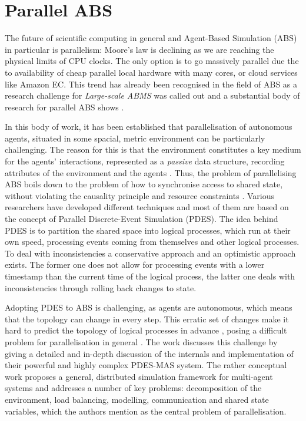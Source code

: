 \chapter{Parallel ABS}
\label{ch:parallel_abs}
The future of scientific computing in general and Agent-Based Simulation (ABS) in particular is parallelism: Moore's law is declining as we are reaching the physical limits of CPU clocks. The only option is to go massively parallel due the to availability of cheap parallel local hardware with many cores, or cloud services like Amazon EC. This trend has already been recognised in the field of ABS as a research challenge for \textit{Large-scale ABMS} \cite{macal_everything_2016} was called out and a substantial body of research for parallel ABS shows \cite{abar_agent_2017, cicirelli_efficient_2015,  gasser_mace3j:_2002,  gorur_repast_2016, hay_experiments_2015, himmelspach_plugn_2007, lees_using_2008, logan_distributed_2001, minson_distributing_2008, riley_next_2003, suryanarayanan_synchronised_2013, suryanarayanan_pdes-mas_2013}. 

In this body of work, it has been established that parallelisation of autonomous agents, situated in some spacial, metric environment can be particularly challenging. The reason for this is that the environment constitutes a key medium for the agents' interactions, represented as a \textit{passive} data structure, recording attributes of the environment and the agents \cite{lees_using_2008}. Thus, the problem of parallelising ABS boils down to the problem of how to synchronise access to shared state, without violating the causality principle and resource constraints \cite{logan_distributed_2001, suryanarayanan_pdes-mas_2013}. Various researchers have developed different techniques and most of them are based on the concept of Parallel Discrete-Event Simulation (PDES). The idea behind PDES is to partition the shared space into logical processes, which run at their own speed, processing events coming from themselves and other logical processes. To deal with inconsistencies a conservative approach and an optimistic approach exists. The former one does not allow for processing events with a lower timestamp than the current time of the logical process, the latter one deals with inconsistencies through rolling back changes to state.

Adopting PDES to ABS is challenging, as agents are autonomous, which means that the topology can change in every step. This erratic set of changes make it hard to predict the topology of logical processes in advance \cite{lees_using_2008}, posing a difficult problem for parallelisation in general \cite{cicirelli_efficient_2015}. The work \cite{suryanarayanan_synchronised_2013, suryanarayanan_pdes-mas_2013} discusses this challenge by giving a detailed and in-depth discussion of the internals and implementation of their powerful and highly complex PDES-MAS system. The rather conceptual work \cite{logan_distributed_2001} proposes a general, distributed simulation framework for multi-agent systems and addresses a number of key problems: decomposition of the environment, load balancing, modelling, communication and shared state variables, which the authors mention as the central problem of parallelisation.


